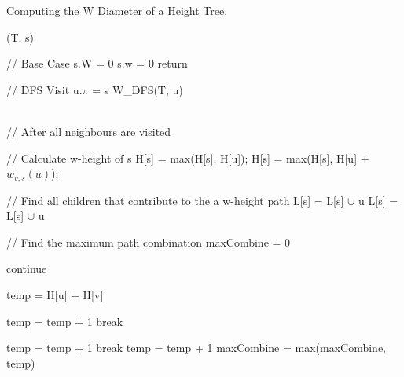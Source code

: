 \begin{algorithm}{}
\caption{Computing the W Diameter of a Height Tree.}
\begin{algorithmic}[1]

    (T, s)

    \State // Base Case
        \State s.W = 0
        \State s.w = 0
        \State return
    \EndIf


    \State // DFS Visit
            \State u.$\pi$ = s
            \State W\_DFS(T, u)
        \EndIf
    \EndFor

    \\

    \State // After all neighbours are visited

    \State // Calculate w-height of s
            \State H[s] = max(H[s], H[u]);
        \Else
                \State H[s] = max(H[s], H[u] + $w_{v, s}(u)$);
            \EndFor
        \EndIf
    \EndFor

    \State // Find all children that contribute to the a w-height path
            \State L[s] = L[s] $\cup$ u
        \Else
                    \State L[s] = L[s] $\cup$ u
                \EndIf
            \EndFor
        \EndIf
    \EndFor

    \State // Find the maximum path combination
    \State maxCombine = 0


                \State continue
            \EndIf

            \State temp = H[u] + H[v]

                        \State temp = temp + 1
                        \State break
                    \EndIf
                \EndFor
            \EndIf

                        \State temp = temp + 1
                        \State break
                    \EndIf
                \EndFor
            \EndIf
                \State temp = temp + 1
            \EndIf
            \State maxCombine = max(maxCombine, temp)
        \EndFor

    \EndFor

\end{algorithmic}
\end{algorithm}
    
